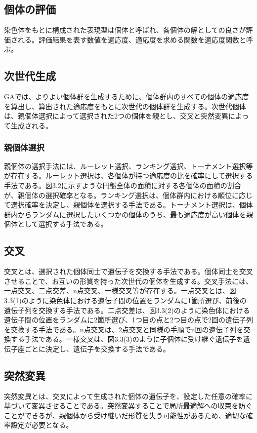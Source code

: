 \subsection{個体の評価}
染色体をもとに構成された表現型は個体と呼ばれ、各個体の解としての良さが評価される。評価結果を表す数値を適応度、適応度を求める関数を適応度関数と呼ぶ。

\subsection{次世代生成}
GAでは、よりよい個体群を生成するために、個体群内のすべての個体の適応度を算出し、算出された適応度をもとに次世代の個体群を生成する。次世代個体は、親個体選択によって選択された2つの個体を親とし、交叉と突然変異によって生成される。

\subsubsection{親個体選択}
親個体の選択手法には、ルーレット選択、ランキング選択、トーナメント選択等が存在する。ルーレット選択は、各個体が持つ適応度の比を確率にして選択する手法である。図3.2に示すような円盤全体の面積に対する各個体の面積の割合が、親個体の選択確率となる。ランキング選択は、個体群内における順位に応じて選択確率を決定し、親個体を選択する手法である。トーナメント選択は、個体群内からランダムに選択したいくつかの個体のうち、最も適応度が高い個体を親個体として選択する手法である。


\subsection{交叉}
交叉とは、選択された個体同士で遺伝子を交換する手法である。個体同士を交叉させることで、お互いの形質を持った次世代の個体を生成する。交叉手法には、一点交叉、二点交差、n点交叉、一様交叉等が存在する。一点交叉とは、図3.3(1)のように染色体における遺伝子間の位置をランダムに1箇所選び、前後の遺伝子列を交換する手法である。二点交差は、図3.3(2)のように染色体における遺伝子間の位置をランダムに2箇所選び、1つ目の点と2つ目の点で2回の遺伝子列を交換する手法である。n点交叉は、2点交叉と同様の手順でn回の遺伝子列を交換する手法である。一様交叉は、図3.3(3)のように子個体に受け継ぐ遺伝子を遺伝子座ごとに決定し、遺伝子を交換する手法である。


\subsection{突然変異}
突然変異とは、交叉によって生成された個体の遺伝子を、設定した任意の確率に基づいて変異させることである。突然変異することで局所最適解への収束を防ぐことができるが、親個体から受け継いだ形質を失う可能性があるため、適切な確率設定が必要となる。
